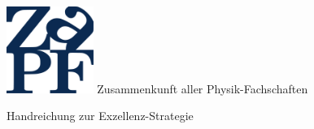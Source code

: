 \documentclass[DIV=calc]{scrartcl}
\begin{document}
    \hspace{0.87\textwidth}
    \begin{minipage}{120pt}
        \vspace{-1.8cm}
        \includegraphics[width=80pt]{logo.pdf}
        \centering
        \small Zusammenkunft aller Physik-Fachschaften
    \end{minipage}
    \begin{center}
        \huge{Handreichung zur Exzellenz-Strategie} \\
        \normalsize
    \end{center}
    
\end{document}
